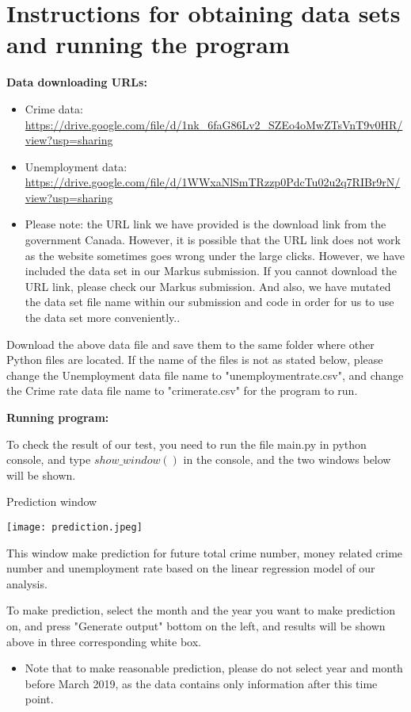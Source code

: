\documentclass[fontsize=11pt]{article}
\begin{document}
\section*{Instructions for obtaining data sets and running the program}
\textbf{Data downloading URLs:}
\begin{itemize}
    \item Crime data: \url{https://drive.google.com/file/d/1nk_6faG86Lv2_SZEo4oMwZTsVnT9v0HR/view?usp=sharing}
    \item Unemployment data: \url{https://drive.google.com/file/d/1WWxaNlSmTRzzp0PdcTu02u2q7RIBr9rN/view?usp=sharing}
    \item Please note: the URL link we have provided is the download link from the government Canada. However, it is possible that the URL link does not work as the website sometimes goes wrong under the large clicks. However, we have included the data set in our Markus submission. If you cannot download the URL link, please check our Markus submission. And also, we have mutated the data set file name within our submission and code in order for us to use the data set more conveniently..
\end{itemize}

Download the above data file and save them to the same folder where other Python files are located. If the name of the files is not as stated below, please change the Unemployment data file name to "unemploymentrate.csv", and change the Crime rate data file name to "crimerate.csv" for the program to run.


\newpage
\textbf{Running program:}

To check the result of our test, you need to run the file main.py in python console, and type $show\_window()$ in the console, and the two windows below will be shown.

Prediction window

\texttt{[image: prediction.jpeg]}

This window make prediction for future total crime number, money related crime number and unemployment rate based on the linear regression model of our analysis.

To make prediction, select the month and the year you want to make prediction on, and press "Generate output" bottom on the left, and results will be shown above in three corresponding white box.

\begin{itemize}
    \item Note that to make reasonable prediction, please do not select year and month before March 2019, as the data contains only information after this time point.
\end{itemize}
\end{document}
